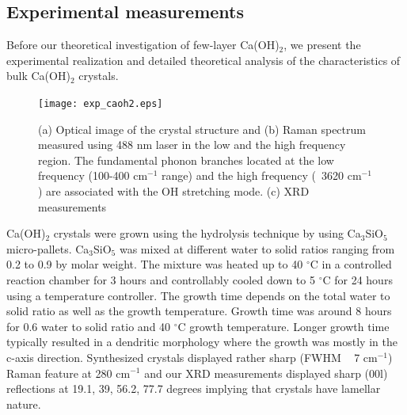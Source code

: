 \subsection{Experimental measurements}


Before our theoretical investigation of few-layer Ca(OH)$_{2}$, we 
present the experimental realization and detailed theoretical analysis of the
characteristics of bulk Ca(OH)$_{2}$ crystals.


\begin{figure}[htbp]
\centering
\texttt{[image: exp\_caoh2.eps]}
\caption{\label{fig:exp_caoh2} (a) Optical image of the crystal structure and (b) Raman 
spectrum measured using 488 nm laser in the low and the high frequency region. 
The fundamental phonon branches located at the low frequency (100-400 cm$^{-1}$  range) and the high frequency (~3620 cm$^{-1}$) are associated with the OH  stretching mode. (c) XRD measurements}
\end{figure}

Ca(OH)$_{2}$ crystals were grown using the hydrolysis technique by using 
Ca$_{3}$SiO$_{5}$ micro-pallets. Ca$_{3}$SiO$_{5}$ was mixed at different water 
to solid ratios ranging from 0.2 to 0.9 by molar weight. The mixture was heated 
up to 40 $^{\circ}\mathrm{C}$ in a controlled reaction chamber for 3 hours and 
controllably cooled down to 5 $^{\circ}\mathrm{C}$ for 24 hours using a
temperature controller. The growth time depends on the total water to solid 
ratio as well as the growth temperature. Growth time was around 8 hours for 0.6 
water to solid ratio and 40 $^{\circ}\mathrm{C}$ growth temperature. 
Longer growth time typically resulted in a dendritic morphology where the 
growth was mostly in the c-axis direction. Synthesized crystals displayed rather sharp (FWHM ~ 7 cm$^{-1}$) Raman feature at 280 cm$^{-1}$ and our XRD measurements displayed sharp (00l) reflections at 19.1, 39, 56.2, 77.7 degrees implying that crystals have lamellar nature.  
 

